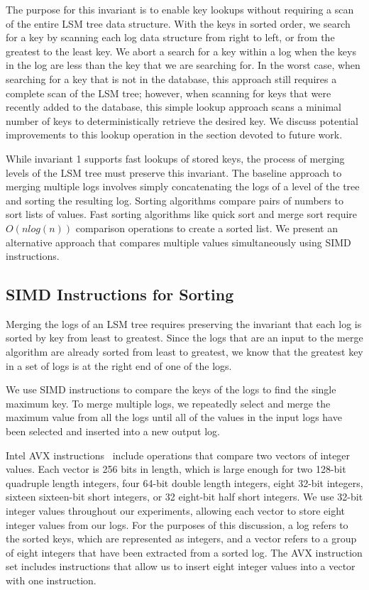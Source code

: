 \documentclass[10pt,twocolumn]{article}
\begin{document}
The purpose for this invariant is to enable key lookups without requiring a scan of the entire LSM tree data structure.  With the keys in sorted order, we search for a key by scanning each log data structure from right to left, or from the greatest to the least key.  We abort a search for a key within a log when the keys in the log are less than the key that we are searching for.  In the worst case, when searching for a key that is not in the database, this approach still requires a complete scan of the LSM tree; however, when scanning for keys that were recently added to the database, this simple lookup approach scans a minimal number of keys to deterministically retrieve the desired key.  We discuss potential improvements to this lookup operation in the section devoted to future work.

While invariant 1 supports fast lookups of stored keys, the process of merging levels of the LSM tree must preserve this invariant.  The baseline approach to merging multiple logs involves simply concatenating the logs of a level of the tree and sorting the resulting log.  Sorting algorithms compare pairs of numbers to sort lists of values.  Fast sorting algorithms like quick sort and merge sort require $O(n\textit{log}(n))$ comparison operations to create a sorted list.  We present an alternative approach that compares multiple values simultaneously using SIMD instructions.

\subsection{SIMD Instructions for Sorting}
Merging the logs of an LSM tree requires preserving the invariant that each log is sorted by key from least to greatest.  Since the logs that are an input to the merge algorithm are already sorted from least to greatest, we know that the greatest key in a set of logs is at the right end of one of the logs.

We use SIMD instructions to compare the keys of the logs to find the single maximum key.  To merge multiple logs, we repeatedly select and merge the maximum value from all the logs until all of the values in the input logs have been selected and inserted into a new output log.

Intel AVX instructions~\cite{p2} include operations that compare two vectors of integer values.  Each vector is 256 bits in length, which is large enough for two 128-bit quadruple length integers, four 64-bit double length integers, eight 32-bit integers, sixteen sixteen-bit short integers, or 32 eight-bit half short integers.  We use 32-bit integer values throughout our experiments, allowing each vector to store eight integer values from our logs.   For the purposes of this discussion, a log refers to the sorted keys, which are represented as integers, and a vector refers to a group of eight integers that have been extracted from a sorted log.  The AVX instruction set includes instructions that allow us to insert eight integer values into a vector with one instruction.
\end{document}
